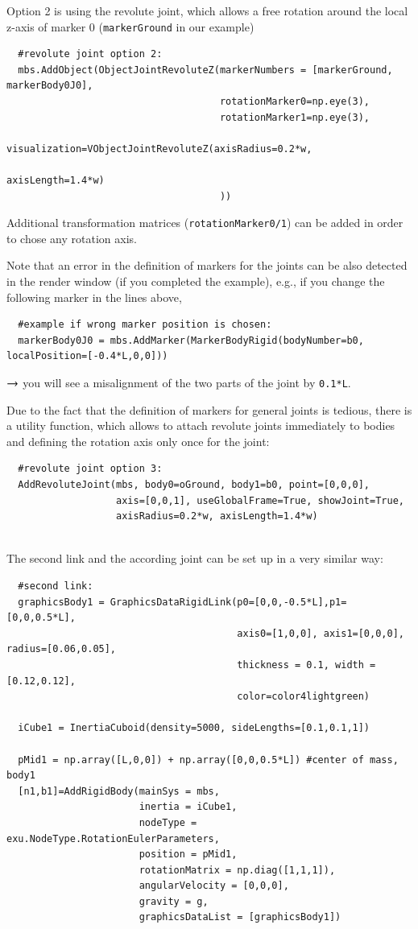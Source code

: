 \noindent Option 2 is using the revolute joint, which allows a free rotation around the local z-axis of marker 0 (\texttt{markerGround} in our example)
\pythonstyle\begin{lstlisting}
  #revolute joint option 2:
  mbs.AddObject(ObjectJointRevoluteZ(markerNumbers = [markerGround, markerBody0J0], 
                                     rotationMarker0=np.eye(3),
                                     rotationMarker1=np.eye(3),
                                     visualization=VObjectJointRevoluteZ(axisRadius=0.2*w, 
                                                                         axisLength=1.4*w)
                                     )) 
\end{lstlisting}
Additional transformation matrices (\texttt{rotationMarker0/1}) can be added in order to chose any rotation axis.

\noindent Note that an error in the definition of markers for the joints can be also detected in the render window (if you completed the example), e.g., if you change the following marker in the lines above,
\pythonstyle\begin{lstlisting}
  #example if wrong marker position is chosen:
  markerBody0J0 = mbs.AddMarker(MarkerBodyRigid(bodyNumber=b0, localPosition=[-0.4*L,0,0]))
\end{lstlisting}
$\rightarrow$ you will see a misalignment of the two parts of the joint by \texttt{0.1*L}.

\noindent Due to the fact that the definition of markers for general joints is tedious, there is a utility function, which allows to attach revolute joints immediately to bodies and defining the rotation axis only once for the joint:
\pythonstyle\begin{lstlisting}
  #revolute joint option 3:
  AddRevoluteJoint(mbs, body0=oGround, body1=b0, point=[0,0,0], 
                   axis=[0,0,1], useGlobalFrame=True, showJoint=True,
                   axisRadius=0.2*w, axisLength=1.4*w)
\end{lstlisting}

\horizontalRuler\\
\noindent The second link and the according joint can be set up in a very similar way:
\pythonstyle\begin{lstlisting}
  #second link:
  graphicsBody1 = GraphicsDataRigidLink(p0=[0,0,-0.5*L],p1=[0,0,0.5*L], 
                                        axis0=[1,0,0], axis1=[0,0,0], radius=[0.06,0.05], 
                                        thickness = 0.1, width = [0.12,0.12], 
                                        color=color4lightgreen)

  iCube1 = InertiaCuboid(density=5000, sideLengths=[0.1,0.1,1])

  pMid1 = np.array([L,0,0]) + np.array([0,0,0.5*L]) #center of mass, body1
  [n1,b1]=AddRigidBody(mainSys = mbs,
                       inertia = iCube1,
                       nodeType = exu.NodeType.RotationEulerParameters,
                       position = pMid1,
                       rotationMatrix = np.diag([1,1,1]),
                       angularVelocity = [0,0,0],
                       gravity = g,
                       graphicsDataList = [graphicsBody1])
\end{lstlisting}

